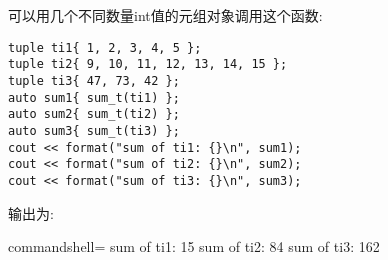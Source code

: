 可以用几个不同数量int值的元组对象调用这个函数:

\begin{lstlisting}[style=styleCXX]
tuple ti1{ 1, 2, 3, 4, 5 };
tuple ti2{ 9, 10, 11, 12, 13, 14, 15 };
tuple ti3{ 47, 73, 42 };
auto sum1{ sum_t(ti1) };
auto sum2{ sum_t(ti2) };
auto sum3{ sum_t(ti3) };
cout << format("sum of ti1: {}\n", sum1);
cout << format("sum of ti2: {}\n", sum2);
cout << format("sum of ti3: {}\n", sum3);
\end{lstlisting}

输出为:

\begin{tcblisting}{commandshell={}}
sum of ti1: 15
sum of ti2: 84
sum of ti3: 162
\end{tcblisting}










